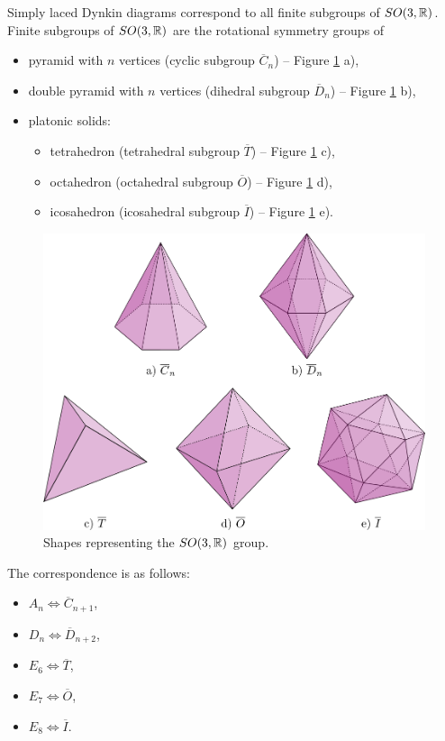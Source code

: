 Simply laced Dynkin diagrams correspond to all finite subgroups of
$SO(3,\R)$. Finite subgroups of
$SO(3,\R)$ are the rotational symmetry groups of
\begin{itemize}
    \item pyramid with $n$ vertices (cyclic subgroup $\overline{C}_n$) -- Figure \ref{img:34} a),
    \item double pyramid with $n$ vertices (dihedral subgroup $\overline{D}_n$) -- Figure \ref{img:34} b),
    \item platonic solids:
    \begin{itemize}
        \item tetrahedron (tetrahedral subgroup $\overline{T}$) -- Figure \ref{img:34} c),
        \item octahedron (octahedral subgroup $\overline{O}$) -- Figure \ref{img:34} d),
        \item icosahedron (icosahedral subgroup $\overline{I}$) -- Figure \ref{img:34} e).
    \end{itemize}
\end{itemize}

\begin{figure}
    \centerline{\includegraphics[scale=0.5]{images/img34}}
    \caption[Shapes representing the $SO(3,\R)$ group]
    {Shapes representing the $SO(3,\R)$ group.}
    \label{img:34}
\end{figure}

The correspondence is as follows:
\begin{itemize}
    \item $A_n \iff \overline{C}_{n+1}$,
    \item $D_n \iff \overline{D}_{n+2}$,
    \item $E_6 \iff \overline{T}$,
    \item $E_7 \iff \overline{O}$,
    \item $E_8 \iff \overline{I}$.
\end{itemize}


